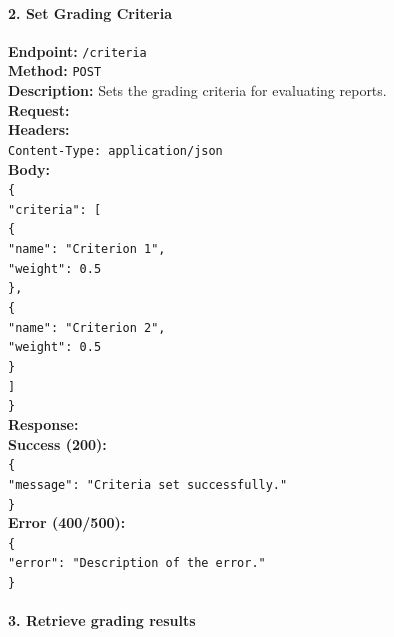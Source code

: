 \documentclass[a4paper, 12pt]{article}
\begin{document}
\paragraph{2. Set Grading Criteria}

\begin{tabbing}
\textbf{Endpoint:} \= \texttt{/criteria} \\
\textbf{Method:} \> \texttt{POST} \\
\textbf{Description:} \> Sets the grading criteria for evaluating reports. \\
\textbf{Request:} \\
\> \textbf{Headers:} \\
\> \> \texttt{Content-Type: application/json} \\
\> \textbf{Body:} \\
\> \> \texttt{\{ \\
\> \> \> "criteria": [ \\
\> \> \> \> \{ \\
\> \> \> \> \> "name": "Criterion 1", \\
\> \> \> \> \> "weight": 0.5 \\
\> \> \> \> \}, \\
\> \> \> \> \{ \\
\> \> \> \> \> "name": "Criterion 2", \\
\> \> \> \> \> "weight": 0.5 \\
\> \> \> \> \} \\
\> \> \> ] \\
\> \> \}} \\
\textbf{Response:} \\
\> \textbf{Success (200):} \\
\> \> \texttt{\{ \\
\> \> \> "message": "Criteria set successfully." \\
\> \> \}} \\
\> \textbf{Error (400/500):} \\
\> \> \texttt{\{ \\
\> \> \> "error": "Description of the error." \\
\> \> \}}
\end{tabbing}

\paragraph{3. Retrieve grading results}
\end{document}
